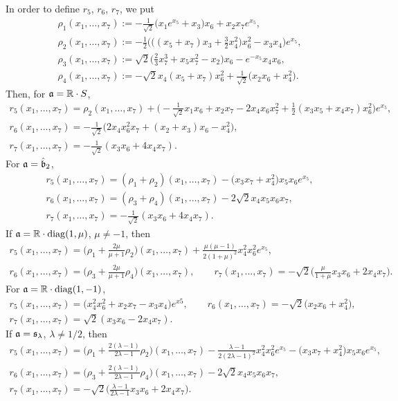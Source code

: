 \documentclass[pdftex]{sigma}
\numberwithin{equation}{section}
\newcommand\fa{{\frak a}}
\newcommand\fb{{\frak b}}
\newcommand\fs{{\frak s}}
\newcommand\RR{{\mathbb R}}
\newcommand{\diag}{\operatorname{diag}}
\begin{document}
In order to define $r_5$, $r_6$, $r_7$, we put
\begin{gather*}
\rho_1(x_1,\dots,x_7) := -\tfrac1{\sqrt2}\big(x_1e^{x_5}+x_3\big)x_6+x_2x_7e^{x_5} ,\\
\rho_2(x_1,\dots,x_7) := -\tfrac12\big(\big((x_5+x_7)x_3+\tfrac32 x_4^2\big)x_6^2-x_3x_4\big)e^{x_5}, \\
\rho_3(x_1,\dots,x_7) := \sqrt 2 \big(\tfrac23 x_7^3+x_5x_7^2-x_2\big)x_6-e^{-x_5}x_4x_6 ,\\
\rho_4(x_1,\dots,x_7) := -\sqrt 2x_4(x_5+x_7)x_6^2+\tfrac 1{\sqrt 2}\big(x_2x_6+x_4^2\big).
\end{gather*}
Then, for $\fa=\RR\cdot S$,
\begin{gather*}
r_5(x_1,\dots, x_7) = \rho_2(x_1,\dots,x_7)+ \big({-}\tfrac 1{\sqrt2} x_1x_6+x_2x_7-2x_4x_6x_7^2+\tfrac12(x_3x_5+x_4x_7)x_6^2\big)e^{x_5},\\
r_6(x_1,\dots, x_7) = -\tfrac 1{\sqrt2}\big( 2x_4x_6^2x_7 +(x_2+x_3)x_6-x_4^2\big) , \\
r_7(x_1,\dots, x_7) = -\tfrac1{\sqrt2}(x_3x_6+4x_4x_7).
\end{gather*}
For $\fa=\hat \fb_2$,
\begin{gather*}
r_5(x_1,\dots, x_7) = (\rho_1+\rho_2)(x_1,\dots,x_7)-\big(x_3x_7+x_4^2\big)x_5x_6 e^{x_5}, \\
r_6(x_1,\dots, x_7) = (\rho_3+\rho_4)(x_1,\dots,x_7)-2\sqrt2 x_4x_5x_6x_7 , \\
r_7(x_1,\dots, x_7) = -\tfrac1{\sqrt2}(x_3x_6+4x_4x_7).
\end{gather*}
If $\fa=\RR\cdot\diag(1,\mu)$, $\mu\not=-1$, then
\begin{gather*}
r_5(x_1,\dots, x_7) = \big(\rho_1+\tfrac{2\mu}{\mu+1}\rho_2\big)(x_1,\dots, x_7)+\tfrac{\mu(\mu-1)}{2(1+\mu)^2}x_4^2x_6^2e^{x_5}, \\
r_6(x_1,\dots, x_7) = \big(\rho_3+\tfrac{2\mu}{\mu+1}\rho_4\big)(x_1,\dots, x_7), \qquad
r_7(x_1,\dots, x_7) = -\sqrt2\big(\tfrac{\mu}{1+\mu}x_3x_6 +2x_4x_7\big).
\end{gather*}
For $\fa=\RR\cdot\diag(1,-1)$,
\begin{gather*}
r_5(x_1,\dots, x_7) = \big(x_4^2x_6^2+x_2x_7-x_3x_4\big)e^{x5}, \qquad
r_6(x_1,\dots, x_7) = -\sqrt2\big(x_2x_6+x_4^2\big), \\
r_7(x_1,\dots, x_7) = \sqrt2(x_3x_6-2x_4x_7).
\end{gather*}
If $\fa=\fs_\lambda$, $\lambda\not=1/2$, then
\begin{gather*}
r_5(x_1,\dots, x_7) = \big(\rho_1+\tfrac{2(\lambda-1)}{2\lambda-1}\rho_2\big)(x_1,\dots,x_7) -\tfrac{\lambda-1}{2(2\lambda-1)^2}x_4^2x_6^2e^{x_5}-\big(x_3x_7+x_4^2\big)x_5x_6e^{x_5}, \\
r_6(x_1,\dots, x_7) = \big(\rho_3+\tfrac{2(\lambda-1)}{2\lambda-1}\rho_4\big)(x_1,\dots,x_7)-2\sqrt2 x_4x_5x_6x_7,\\
r_7(x_1,\dots, x_7) = -\sqrt2 \big(\tfrac{\lambda-1}{2\lambda -1}x_3x_6+2 x_4 x_7\big).
\end{gather*}
\end{document}
